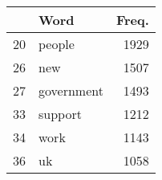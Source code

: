 \begin{tabular}{rlr}
  \toprule
 & Word & Freq. \\ 
  \midrule
20 & people & 1929 \\ 
  26 & new & 1507 \\ 
  27 & government & 1493 \\ 
  33 & support & 1212 \\ 
  34 & work & 1143 \\ 
  36 & uk & 1058 \\ 
   \bottomrule
\end{tabular}
